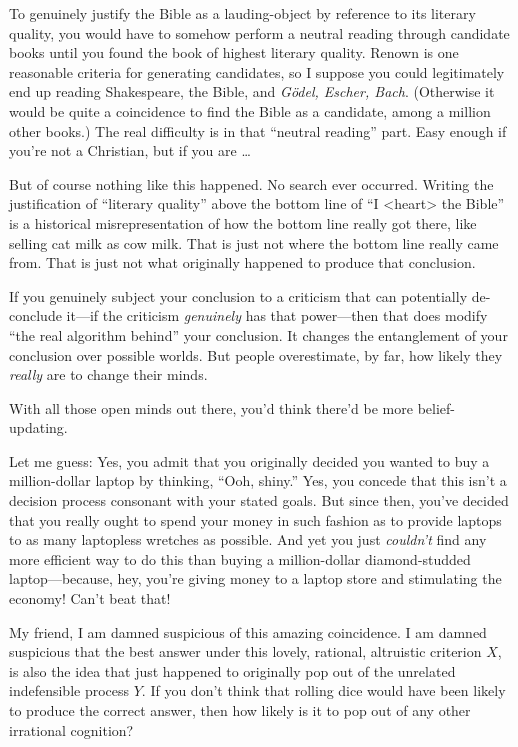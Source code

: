 {
 To genuinely justify the Bible as a lauding-object by reference to
its literary quality, you would have to somehow perform a neutral
reading through candidate books until you found the book of highest
literary quality. Renown is one reasonable criteria for generating
candidates, so I suppose you could legitimately end up reading
Shakespeare, the Bible, and \textit{Gödel, Escher, Bach}. (Otherwise it
would be quite a coincidence to find the Bible as a candidate, among a
million other books.) The real difficulty is in that
``neutral reading'' part. Easy
enough if you're not a Christian, but if you are \ldots}

{
 But of course nothing like this happened. No search ever occurred.
Writing the justification of ``literary
quality'' above the bottom line of
``I {\textless}heart{\textgreater} the
Bible'' is a historical misrepresentation of how the
bottom line really got there, like selling cat milk as cow milk. That
is just not where the bottom line really came from. That is just not
what originally happened to produce that conclusion.}

{
 If you genuinely subject your conclusion to a criticism that can
potentially de-conclude it---if the criticism \textit{genuinely} has
that power---then that does modify ``the real
algorithm behind'' your conclusion. It changes the
entanglement of your conclusion over possible worlds. But people
overestimate, by far, how likely they \textit{really} are to change
their minds.}

{
 With all those open minds out there, you'd think
there'd be more belief-updating.}

{
 Let me guess: Yes, you admit that you originally decided you
wanted to buy a million-dollar laptop by thinking,
``Ooh, shiny.'' Yes, you concede
that this isn't a decision process consonant with your
stated goals. But since then, you've decided that you
really ought to spend your money in such fashion as to provide laptops
to as many laptopless wretches as possible. And yet you just
\textit{couldn't} find any more efficient way to do
this than buying a million-dollar diamond-studded laptop---because,
hey, you're giving money to a laptop store and
stimulating the economy! Can't beat that!}

{
 My friend, I am damned suspicious of this amazing coincidence. I
am damned suspicious that the best answer under this lovely, rational,
altruistic criterion $X$, is also the idea that just happened to
originally pop out of the unrelated indefensible process $Y$. If you
don't think that rolling dice would have been likely to
produce the correct answer, then how likely is it to pop out of any
other irrational cognition?}

